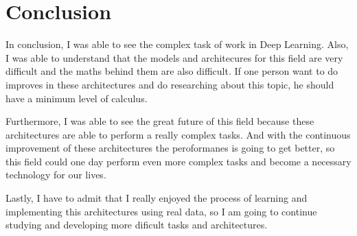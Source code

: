 \documentclass[12pt]{article}
\begin{document}
\section{Conclusion}
In conclusion, I was able to see the complex task of work in Deep Learning. Also, I was able to understand that the models and architecures for this field are very difficult and the maths behind them are also difficult. If one person want to do improves in these architectures and do researching about this topic, he should have a minimum level of calculus.

Furthermore, I was able to see the great future of this field because these architectures are able to perform a really complex tasks. And with the continuous improvement of these architectures the peroformanes is going to get better, so this field could one day perform even more complex tasks and become a necessary technology for our lives.

Lastly, I have to admit that I really enjoyed the process of learning and implementing this architectures using real data, so I am going to continue studying and developing more dificult tasks and architectures.


\end{document}
